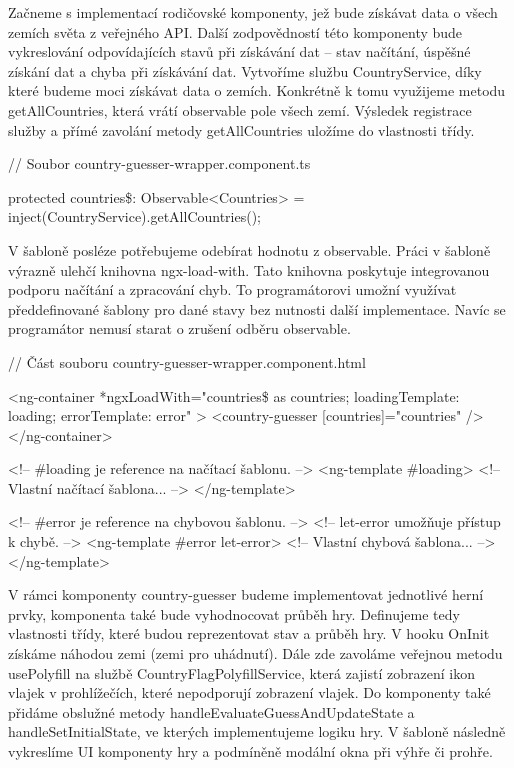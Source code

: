 Začneme s implementací rodičovské komponenty, jež bude získávat data o všech zemích světa z veřejného API. 
Další zodpovědností této komponenty bude vykreslování odpovídajících stavů při získávání dat -- stav načítání, úspěšné získání dat a chyba při získávání dat. 
Vytvoříme službu CountryService, díky které budeme moci získávat data o zemích. Konkrétně k tomu využijeme metodu getAllCountries, která vrátí observable pole všech zemí. 
Výsledek registrace služby a přímé zavolání metody getAllCountries uložíme do vlastnosti třídy.

\begin{prog}
// Soubor country-guesser-wrapper.component.ts

protected countries\$: Observable<Countries> 
  = inject(CountryService).getAllCountries();
\end{prog}

V šabloně posléze potřebujeme odebírat hodnotu z observable. Práci v šabloně výrazně ulehčí knihovna ngx-load-with. 
Tato knihovna poskytuje integrovanou podporu načítání a zpracování chyb. To programátorovi umožní využívat předdefinované šablony pro dané stavy bez nutnosti další implementace. 
Navíc se programátor nemusí starat o zrušení odběru observable.

\begin{prog}
// Část souboru country-guesser-wrapper.component.html

<ng-container
  *ngxLoadWith="countries\$ as countries; 
  loadingTemplate: loading; errorTemplate: error"
>
  <country-guesser [countries]="countries" />
</ng-container>

<!-- \#loading je reference na načítací šablonu. -->
<ng-template \#loading>
  <!-- Vlastní načítací šablona... -->
</ng-template>

<!-- \#error je reference na chybovou šablonu. -->
<!-- let-error umožňuje přístup k chybě. -->
<ng-template \#error let-error>
  <!-- Vlastní chybová šablona... -->
</ng-template>
\end{prog}

V rámci komponenty country-guesser budeme implementovat jednotlivé herní prvky, komponenta také bude vyhodnocovat průběh hry. 
Definujeme tedy vlastnosti třídy, které budou reprezentovat stav a průběh hry. V hooku OnInit získáme náhodou zemi (zemi pro uhádnutí). 
Dále zde zavoláme veřejnou metodu usePolyfill na službě CountryFlagPolyfillService, která zajistí zobrazení ikon vlajek v prohlížečích, které nepodporují zobrazení vlajek.
Do komponenty také přidáme obslužné metody handleEvaluateGuessAndUpdateState a handleSetInitialState, ve kterých implementujeme logiku hry. 
V šabloně následně vykreslíme UI komponenty hry a podmíněně modální okna při výhře či prohře.

